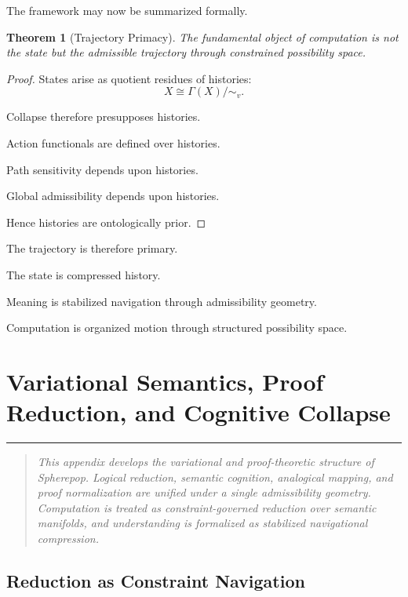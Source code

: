 \documentclass[12pt,openany]{book}
\theoremstyle{plain}
\newtheorem{theorem}{Theorem}[chapter]
\theoremstyle{definition}
\theoremstyle{remark}
\newcommand{\chapterrule}{%
  \vspace{4pt}%
  {\color{SpherepopBlue}\rule{\textwidth}{0.8pt}}%
  \vspace{10pt}%
}
\newenvironment{chapterprecis}{%
  \begin{quote}\small\itshape}{%
  \end{quote}\medskip}
\begin{document}
The framework may now be summarized formally.

\begin{theorem}[Trajectory Primacy]
The fundamental object of computation is not the state but the
admissible trajectory through constrained possibility space.
\end{theorem}

\begin{proof}
States arise as quotient residues of histories:
\[
X
\cong
\Gamma(X)/{\sim_v}.
\]

Collapse therefore presupposes histories.

Action functionals are defined over histories.

Path sensitivity depends upon histories.

Global admissibility depends upon histories.

Hence histories are ontologically prior.
\end{proof}

The trajectory is therefore primary.

The state is compressed history.

Meaning is stabilized navigation through admissibility geometry.

Computation is organized motion through structured possibility
space.



\chapter{Variational Semantics, Proof Reduction, and Cognitive Collapse}
\chapterrule

\begin{chapterprecis}
This appendix develops the variational and proof-theoretic
structure of Spherepop. Logical reduction, semantic cognition,
analogical mapping, and proof normalization are unified under a
single admissibility geometry. Computation is treated as
constraint-governed reduction over semantic manifolds, and
understanding is formalized as stabilized navigational
compression.
\end{chapterprecis}

\section{Reduction as Constraint Navigation}
\end{document}
